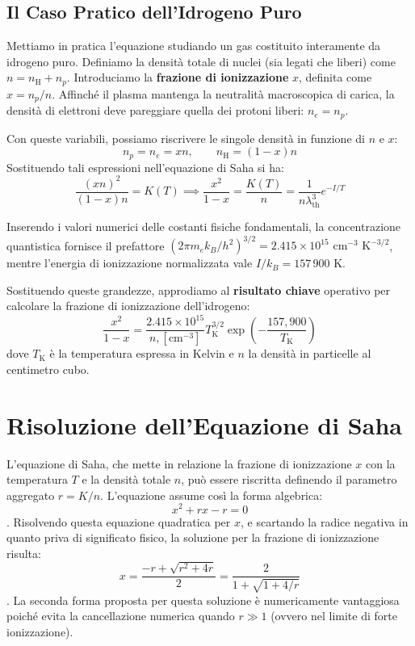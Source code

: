\subsection{Il Caso Pratico dell'Idrogeno Puro}
Mettiamo in pratica l'equazione studiando un gas costituito interamente da idrogeno puro.
Definiamo la densità totale di nuclei (sia legati che liberi) come $n = n_{\text{H}} + n_p$. Introduciamo la \textbf{frazione di ionizzazione} $x$, definita come $x = n_p / n$. Affinché il plasma mantenga la neutralità macroscopica di carica, la densità di elettroni deve pareggiare quella dei protoni liberi: $n_e = n_p$.

Con queste variabili, possiamo riscrivere le singole densità in funzione di $n$ e $x$:
\begin{equation}
n_p = n_e = xn, \quad \quad n_{\text{H}} = (1 - x)n
\end{equation}
Sostituendo tali espressioni nell'equazione di Saha si ha:
\begin{equation}
\frac{(xn)^2}{(1 - x)n} = K(T) \implies \frac{x^2}{1 - x} = \frac{K(T)}{n} = \frac{1}{n \lambda_{\text{th}}^3} e^{-I/T}
\end{equation}

Inserendo i valori numerici delle costanti fisiche fondamentali, la concentrazione quantistica fornisce il prefattore $(2\pi m_e k_B / h^2)^{3/2} = 2.415 \times 10^{15} \text{ cm}^{-3} \text{ K}^{-3/2}$, mentre l'energia di ionizzazione normalizzata vale $I/k_B = 157\,900 \text{ K}$.

Sostituendo queste grandezze, approdiamo al \textbf{risultato chiave} operativo per calcolare la frazione di ionizzazione dell'idrogeno:
\begin{equation}
\frac{x^2}{1 - x} = \frac{2.415 \times 10^{15}}{n , [\text{cm}^{-3}]} T_{\text{K}}^{3/2} \exp\left( -\frac{157,900}{T_{\text{K}}} \right)
\end{equation}
dove $T_{\text{K}}$ è la temperatura espressa in Kelvin e $n$ la densità in particelle al centimetro cubo.

\section{Risoluzione dell'Equazione di Saha}

L'equazione di Saha, che mette in relazione la frazione di ionizzazione $x$ con la temperatura $T$ e la densità totale $n$, può essere riscritta definendo il parametro aggregato $r = K/n$. L'equazione assume così la forma algebrica:
\begin{equation}
x^2 + rx - r = 0
\end{equation}
. Risolvendo questa equazione quadratica per $x$, e scartando la radice negativa in quanto priva di significato fisico, la soluzione per la frazione di ionizzazione risulta:
\begin{equation}
x = \frac{-r + \sqrt{r^2 + 4r}}{2} = \frac{2}{1 + \sqrt{1 + 4/r}}
\end{equation}
. La seconda forma proposta per questa soluzione è numericamente vantaggiosa poiché evita la cancellazione numerica quando $r \gg 1$ (ovvero nel limite di forte ionizzazione).

